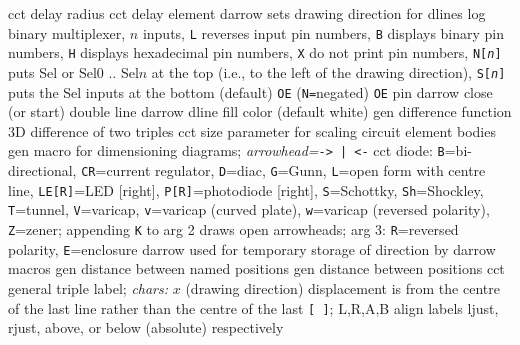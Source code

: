   {cct}
  {delay radius}
  {cct}
  {delay element}
  {darrow}
  {sets drawing direction for dlines}
  {log}
  {binary multiplexer, $n$ inputs,
    {\tt L} reverses input pin numbers,
    {\tt B} displays binary pin numbers,
    {\tt H} displays hexadecimal pin numbers,
    {\tt X} do not print pin numbers,
    {\tt N[{\sl n}]} puts Sel or Sel$0$ .. Sel$n$ at the top
    (i.e., to the left of the drawing direction),
    {\tt S[{\sl n}]} puts the Sel inputs at the bottom (default)
    {\tt OE} ({\tt N=}negated) {\tt OE} pin
    }
  {darrow}
  {close (or start) double line}
  {darrow}
  {dline fill color (default white)}
  {gen}
  {difference function}
  {3D}
  {difference of two triples}
  {cct}
  {size parameter for scaling circuit element bodies }
  {gen}
  {macro for dimensioning diagrams;
      {\sl arrowhead=}{\tt -> | <-}}
  {cct}
  {diode:
   {\tt B}=bi-directional,
   {\tt CR}=current regulator,
   {\tt D}=diac,
   {\tt G}=Gunn,
   {\tt L}=open form with centre line,
   {\tt LE[R]}=LED [right],
   {\tt P[R]}=photodiode [right],
   {\tt S}=Schottky,
   {\tt Sh}=Shockley,
   {\tt T}=tunnel,
   {\tt V}=varicap,
   {\tt v}=varicap (curved plate),
   {\tt w}=varicap (reversed polarity),
   {\tt Z}=zener;
   appending {\tt K} to arg 2 draws open arrowheads;
   arg 3: {\tt R}=reversed polarity, {\tt E}=enclosure }
  {darrow}
  {used for temporary storage of direction by darrow macros}
  {gen}
  {distance between named positions}
  {gen}
  {distance between positions}
  {cct}
  {general triple label; {\sl chars:}
    $x$ (drawing direction) displacement is from the centre of the last
      line rather than the centre of the last {\tt [ ]};
    L,R,A,B align labels ljust, rjust, above,
      or below (absolute) respectively  }
